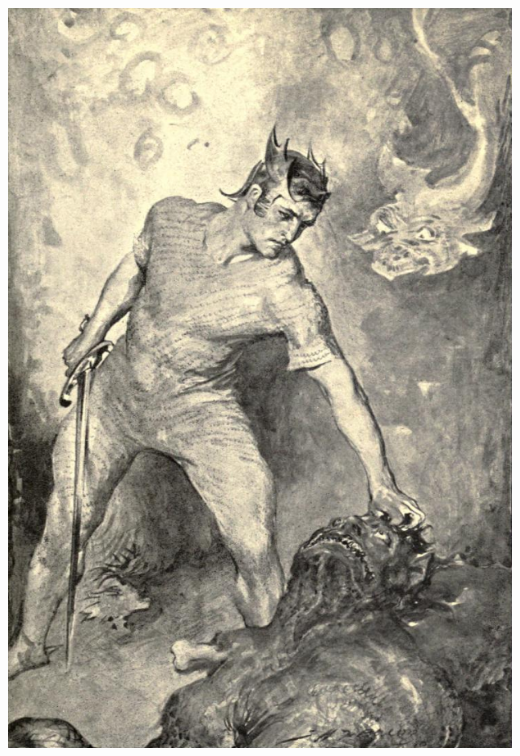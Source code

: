\documentclass[aspectratio=169]{beamer}
\begin{document}
\begin{frame}[fragile]
\begin{columns}
  \includegraphics[width=\linewidth]{Beowulf}
\end{columns}
\end{frame}
\end{document}
